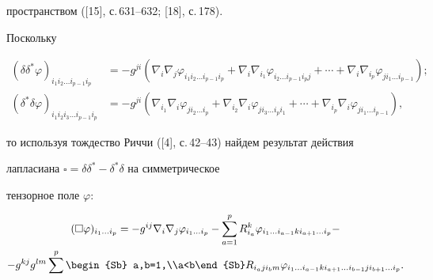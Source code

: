 пространством ([15], с.\,631--632; [18], с.\,178). 


 


Поскольку 


\begin{align*} 


(\delta\delta^*\varphi)_{i_1i_2\dotsc i_{p-1}i_p}&= 


-g^{ji}(\nabla_i\nabla_j 


\varphi_{i_1i_2\dotsc i_{p-1}i_p}+\nabla_i\nabla_{i_1} 


\varphi_{i_2\dotsc i_{p-1}i_p j}+\dotsb+\nabla_i\nabla_{i_p} 


\varphi_{ji_1\dotsc i_{p-1}});\\ 


% 


(\delta^*\delta\varphi)_{i_1i_2i_3\dotsc i_{p-1}i_p}&= 


-g^{ji}(\nabla_{i_1}\nabla_i\varphi_{ji_2\dotsc i_p}+ 


\nabla_{i_2}\nabla_i\varphi_{ji_3\dotsc i_p i_1}+\dotsb+ 


\nabla_{i_p}\nabla_i\varphi_{ji_1\dotsc i_{p-1}}), 


\end{align*} 


то используя тождество Риччи ([4], с.\,42--43) найдем результат действия 


лапласиана $\square=\delta\delta^*-\delta^*\delta$ на симметрическое 


тензорное поле $\varphi$: 


\begin{multline} 


(\square\varphi)_{i_1\dotsc i_p}=-g^{ij}\nabla_i\nabla_j 


\varphi_{i_1\dotsc i_p}-\sum^p_{a=1}R^k_{i_a} 


\varphi_{i_1\dotsc i_{a-1}k i_{a+1}\dotsc i_p}- \\


-g^{kj}g^{lm}\sum^p\begin{Sb} a,b=1,\\a<b\end{Sb} 


R_{i_a j i_b m}\varphi_{i_1\dotsc i_{a-1}k 


i_{a+1}\dotsc i_{b-1}j i_{b+1}\dotsc i_p}. 


\end{multline} 


 



